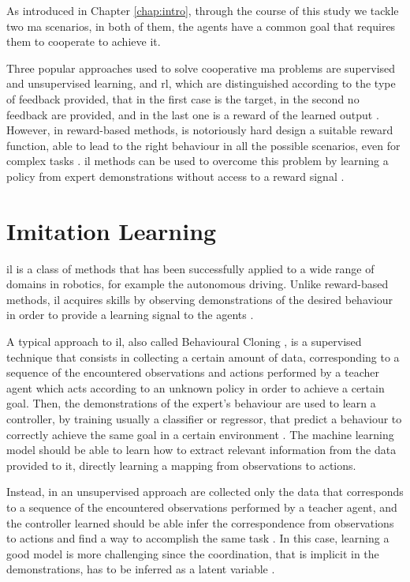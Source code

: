 As introduced in Chapter \ref{chap:intro}, through the course of this study we 
tackle two \gls{ma} scenarios, in both of them, the agents have a common goal 
that requires them to cooperate to achieve it. 

Three popular approaches used to solve cooperative \gls{ma} problems are 
supervised and unsupervised learning, and \gls{rl}, which are distinguished 
according to the type of feedback provided, that in the first case is the target, in 
the second no feedback are provided, and in the last one is a reward of the 
learned output \cite[][]{panait2005cooperative}.
However, in reward-based methods, is notoriously hard design a suitable reward 
function, able to lead to the right behaviour in all the possible scenarios, even for 
complex tasks \cite[][]{hadfield2017inverse}.
\gls{il} methods can be used to overcome this problem by learning a policy from 
expert demonstrations without access to a reward signal \cite[][]{song2018multi}.

\section{Imitation Learning}
\label{sec:imitlrng}

\gls{il} is a class of methods that has been successfully applied to a 
wide range of domains in robotics, for example the autonomous driving.
Unlike reward-based methods, \gls{il} acquires skills by observing demonstrations 
of the desired behaviour in order to provide a learning signal to the agents 
\cite[][]{zhang2018deep}.

A typical approach to \gls{il}, also called Behavioural Cloning 
\cite[][]{torabi2018behavioral}, is a supervised technique that consists in 
collecting a certain amount of data, corresponding to a sequence of the 
encountered observations and actions performed by a teacher agent which acts 
according to an unknown policy in order to achieve a certain goal.
Then, the demonstrations of the expert’s behaviour are used to learn a controller, 
by training usually a classifier or regressor, that predict a behaviour to correctly 
achieve the same goal in a certain environment \cite[][]{stadie2017third, 
ross2011reduction}.
The machine learning model should be able to learn how to extract relevant 
information from the data provided to it, directly learning a mapping from 
observations to actions.

Instead, in an unsupervised approach are collected only the data that corresponds 
to a sequence of the encountered observations performed by a teacher agent, 
and the controller learned should be able infer the correspondence from 
observations to actions and find a way to accomplish the same task 
\cite[][]{stadie2017third}.
In this case, learning a good model is more challenging since the coordination, 
that is implicit in the demonstrations, has to be inferred as a latent variable 
\cite[][]{le2017coordinated}.

